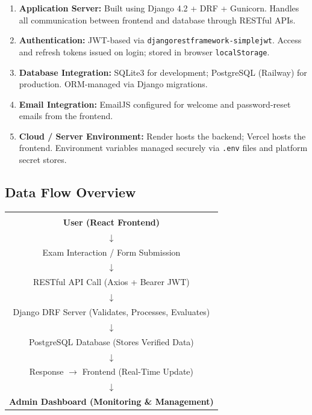 \documentclass[12pt,a4paper]{article}
\begin{document}
\begin{enumerate}[leftmargin=1.5em]
  \item \textbf{Application Server:} Built using Django 4.2 + DRF + Gunicorn. Handles all communication between frontend and database through RESTful APIs.
  \item \textbf{Authentication:} JWT-based via \texttt{djangorestframework-simplejwt}. Access and refresh tokens issued on login; stored in browser \texttt{localStorage}.
  \item \textbf{Database Integration:} SQLite3 for development; PostgreSQL (Railway) for production. ORM-managed via Django migrations.
  \item \textbf{Email Integration:} EmailJS configured for welcome and password-reset emails from the frontend.
  \item \textbf{Cloud / Server Environment:} Render hosts the backend; Vercel hosts the frontend. Environment variables managed securely via \texttt{.env} files and platform secret stores.
\end{enumerate}

\subsection{Data Flow Overview}

\begin{center}
\begin{tabular}{c}
  \hline\\
  \textbf{User (React Frontend)} \\[4pt]
  $\downarrow$ \\[4pt]
  Exam Interaction / Form Submission \\[4pt]
  $\downarrow$ \\[4pt]
  RESTful API Call (Axios + Bearer JWT) \\[4pt]
  $\downarrow$ \\[4pt]
  Django DRF Server (Validates, Processes, Evaluates) \\[4pt]
  $\downarrow$ \\[4pt]
  PostgreSQL Database (Stores Verified Data) \\[4pt]
  $\downarrow$ \\[4pt]
  Response $\rightarrow$ Frontend (Real-Time Update) \\[4pt]
  $\downarrow$ \\[4pt]
  \textbf{Admin Dashboard (Monitoring \& Management)} \\[4pt]
  \hline
\end{tabular}
\end{center}
\end{document}
